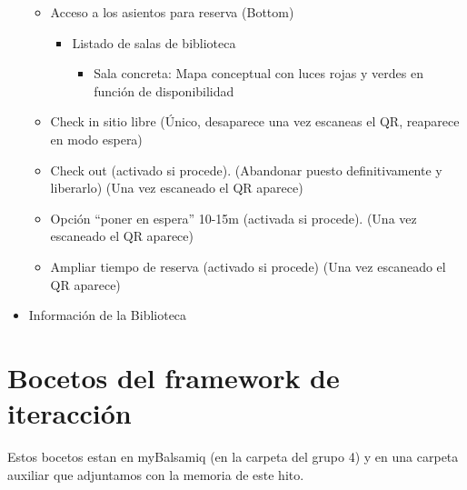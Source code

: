 \documentclass[12pt]{article}
\begin{document}
\begin{itemize}
\begin{itemize}
\begin{itemize}
\begin{itemize}
\end{itemize}

\end{itemize}

\item Acceso a los asientos para reserva (Bottom)

\begin{itemize}
\item Listado de salas de biblioteca
\begin{itemize}
\item Sala concreta: Mapa conceptual con luces rojas y verdes en función de disponibilidad

\end{itemize}
\end{itemize}

\item Check in sitio libre (Único, desaparece una vez escaneas el QR, reaparece en modo espera)

\item Check out (activado si procede). (Abandonar puesto definitivamente y liberarlo) (Una vez escaneado el QR aparece)
\item Opción “poner en espera” 10-15m (activada si procede). (Una vez escaneado el QR aparece)

\item Ampliar tiempo de reserva (activado si procede) (Una vez escaneado el QR aparece)


\end{itemize}

\item Información de la Biblioteca


\end{itemize}





\newpage
\section{Bocetos del framework de iteracción}

Estos bocetos estan en myBalsamiq (en la carpeta del grupo 4) y en una carpeta auxiliar que adjuntamos con la memoria de este hito.

\end{document}
